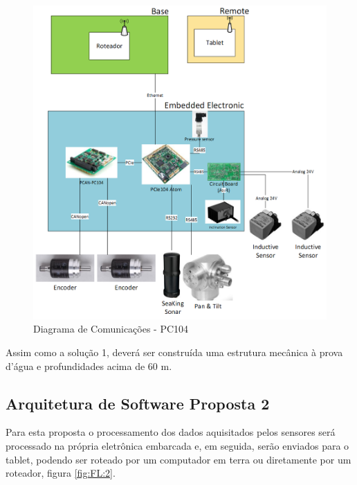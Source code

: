 \begin{figure}[H]
    \centering
    \includegraphics[width=1\columnwidth]{figs/eletronica/4.png}
    \caption{Diagrama de Comunicações - PC104}
    \label{pc104}
\end{figure} 
 
Assim como a solução 1, deverá ser construída uma estrutura mecânica à prova
d’água e profundidades acima de 60 m.

\subsection{Arquitetura de Software Proposta 2}

Para esta proposta o processamento dos dados aquisitados pelos sensores será
processado na própria eletrônica embarcada e, em seguida,
 serão enviados para o tablet, podendo ser roteado por um computador em terra ou
 diretamente por um roteador, figura \ref{fig:FL:2}.
 
